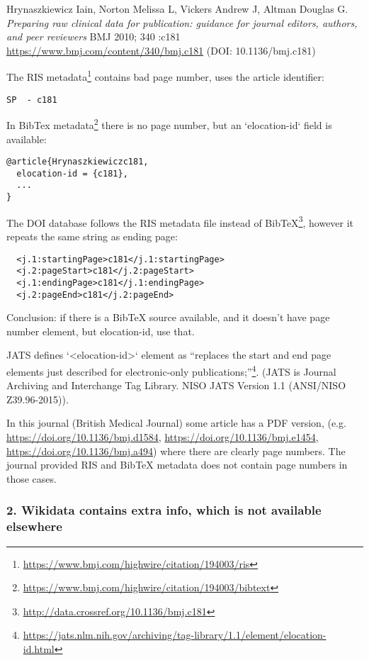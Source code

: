 Hrynaszkiewicz Iain, Norton Melissa L, Vickers Andrew J, Altman Douglas G. \emph{Preparing raw clinical data for publication: guidance for journal editors, authors, and peer reviewers} BMJ 2010; 340 :c181 \url{https://www.bmj.com/content/340/bmj.c181} (DOI: 10.1136/bmj.c181)

The RIS metadata\footnote{\url{https://www.bmj.com/highwire/citation/194003/ris}} contains bad page number, uses the article identifier:

\begin{lstlisting}
SP  - c181
\end{lstlisting}

In BibTex metadata\footnote{\url{https://www.bmj.com/highwire/citation/194003/bibtext}} there is no page number, but an `elocation-id` field is available:
\begin{lstlisting}
@article{Hrynaszkiewiczc181,
  elocation-id = {c181},
  ...
}
\end{lstlisting}

The DOI database follows the RIS metadata file instead of BibTeX\footnote{\url{http://data.crossref.org/10.1136/bmj.c181}}, however it repeats the same string as ending page:

\begin{lstlisting}
  <j.1:startingPage>c181</j.1:startingPage>
  <j.2:pageStart>c181</j.2:pageStart>
  <j.1:endingPage>c181</j.1:endingPage>
  <j.2:pageEnd>c181</j.2:pageEnd>
\end{lstlisting}

Conclusion: if there is a BibTeX source available, and it doesn't have page number element, but elocation-id, use that. 

JATS defines `<elocation-id>` element as ``replaces the start and end page elements just described for electronic-only publications;''\footnote{\url{https://jats.nlm.nih.gov/archiving/tag-library/1.1/element/elocation-id.html}}. (JATS is Journal Archiving and Interchange Tag Library. NISO JATS Version 1.1 (ANSI/NISO Z39.96-2015)).

In this journal (British Medical Journal) some article has a PDF version, (e.g. \url{https://doi.org/10.1136/bmj.d1584}, \url{https://doi.org/10.1136/bmj.e1454}, \url{https://doi.org/10.1136/bmj.a494}) where there are clearly page numbers. The journal provided RIS and BibTeX metadata does not contain page numbers in those cases.

\subsubsection{2. Wikidata contains extra info, which is not available elsewhere}

